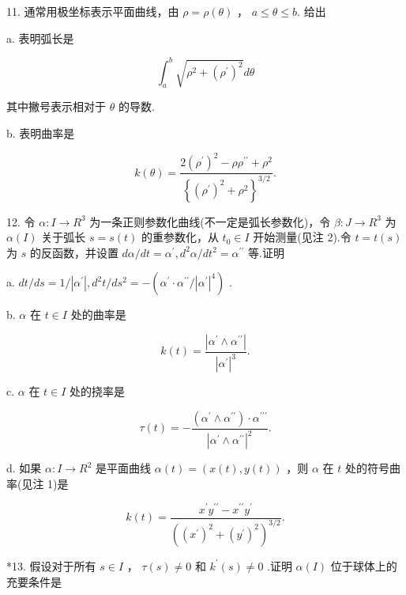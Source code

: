 11. 通常用极坐标表示平面曲线，由 \(\rho  = \rho \left( \theta \right)\) ， \(a \leq  \theta  \leq  b.\) 给出

a. 表明弧长是

\[
{\int }_{a}^{b}\sqrt{{\rho }^{2} + {\left( {\rho }^{\prime }\right) }^{2}}{d\theta }
\]

其中撇号表示相对于 \(\theta\) 的导数.

b. 表明曲率是

\[
k\left( \theta \right)  = \frac{2{\left( {\rho }^{\prime }\right) }^{2} - \rho {\rho }^{\prime \prime } + {\rho }^{2}}{{\left\{  {\left( {\rho }^{\prime }\right) }^{2} + {\rho }^{2}\right\}  }^{3/2}}.
\]

12. 令 \(\alpha  : I \rightarrow  {R}^{3}\) 为一条正则参数化曲线(不一定是弧长参数化)，令 \(\beta  : J \rightarrow  {R}^{3}\) 为 \(\alpha \left( I\right)\) 关于弧长 \(s = s\left( t\right)\) 的重参数化，从 \({t}_{0} \in  I\) 开始测量(见注 2).令 \(t = t\left( s\right)\) 为 \(s\) 的反函数，并设置 \({d\alpha }/{dt} = {\alpha }^{\prime },{d}^{2}\alpha /d{t}^{2} = {\alpha }^{\prime \prime }\) 等.证明

a. \({dt}/{ds} = 1/\left| {\alpha }^{\prime }\right| ,{d}^{2}t/d{s}^{2} =  - \left( {{\alpha }^{\prime } \cdot  {\alpha }^{\prime \prime }/{\left| {\alpha }^{\prime }\right| }^{4}}\right)\) .

b. \(\alpha\) 在 \(t \in  I\) 处的曲率是

\[
k\left( t\right)  = \frac{\left| {\alpha }^{\prime } \land  {\alpha }^{\prime \prime }\right| }{{\left| {\alpha }^{\prime }\right| }^{3}}.
\]

c. \(\alpha\) 在 \(t \in  I\) 处的挠率是

\[
\tau \left( t\right)  =  - \frac{\left( {{\alpha }^{\prime } \land  {\alpha }^{\prime \prime }}\right)  \cdot  {\alpha }^{\prime \prime \prime }}{{\left| {\alpha }^{\prime } \land  {\alpha }^{\prime \prime }\right| }^{2}}.
\]

d. 如果 \(\alpha  : I \rightarrow  {R}^{2}\) 是平面曲线 \(\alpha \left( t\right)  = \left( {x\left( t\right) ,y\left( t\right) }\right)\) ，则 \(\alpha\) 在 \(t\) 处的符号曲率(见注 1)是

\[
k\left( t\right)  = \frac{{x}^{\prime }{y}^{\prime \prime } - {x}^{\prime \prime }{y}^{\prime }}{{\left( {\left( {x}^{\prime }\right) }^{2} + {\left( {y}^{\prime }\right) }^{2}\right) }^{3/2}}.
\]

*13. 假设对于所有 \(s \in  I\) ， \(\tau \left( s\right)  \neq  0\) 和 \({k}^{\prime }\left( s\right)  \neq  0\) .证明 \(\alpha \left( I\right)\) 位于球体上的充要条件是


